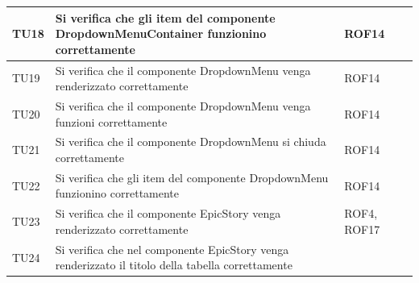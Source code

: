 \documentclass{article}
\begin{document}
\begin{center}
\begin{tabular}{P{5em} P{21em} P{6em} P{6em}}
    \hline
    \end{tabular}
        \end{center}
        
    \begin{center}
    \begin{tabular}{P{5em} P{21em} P{6em} P{6em}}
    TU18 &  Si verifica che gli item del componente DropdownMenuContainer funzionino correttamente& ROF14  & \\
    \hline{}
     TU19 &  Si verifica che il componente DropdownMenu venga renderizzato correttamente & ROF14  & \\
    \hline
    TU20 & Si verifica che il componente DropdownMenu venga funzioni correttamente & ROF14  & \\
    \hline{}
    TU21 &  Si verifica che il componente DropdownMenu si chiuda correttamente & ROF14  & \\
    \hline{}
     TU22 & Si verifica che gli item del componente DropdownMenu funzionino correttamente & ROF14  & \\
    \hline
    TU23 & Si verifica che il componente EpicStory venga renderizzato correttamente &ROF4, ROF17 & \\
    
     \hline{}
     TU24 & Si verifica che nel componente EpicStory venga renderizzato il titolo della tabella correttamente  &  & \\
    \hline
    

\end{tabular}
\end{center}
\end{document}
